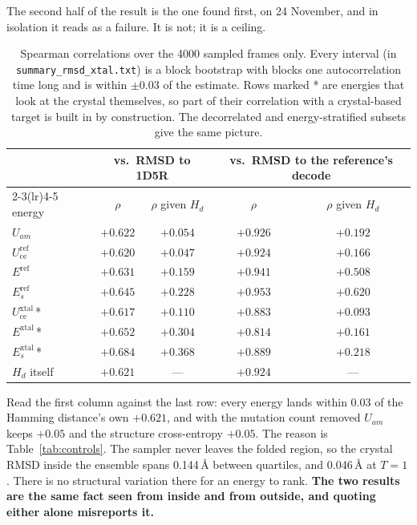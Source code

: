 \documentclass[11pt,a4paper]{article}
\begin{document}
The second half of the result is the one found first, on 24 November, and in isolation it
reads as a failure. It is not; it is a ceiling.

\begin{table}[h]
\centering
\begin{tabular}{lcccc}
\toprule
 & \multicolumn{2}{c}{vs.\ RMSD to 1D5R} & \multicolumn{2}{c}{vs.\ RMSD to the reference's decode} \\
\cmidrule(lr){2-3}\cmidrule(lr){4-5}
energy & $\rho$ & $\rho$ given $H_d$ & $\rho$ & $\rho$ given $H_d$ \\
\midrule
$U_{am}$                      & $+0.622$ & $+0.054$ & $+0.926$ & $+0.192$ \\
$U_{\mathrm{ce}}^{\mathrm{ref}}$ & $+0.620$ & $+0.047$ & $+0.924$ & $+0.166$ \\
$E^{\mathrm{ref}}$            & $+0.631$ & $+0.159$ & $+0.941$ & $+0.508$ \\
$E_s^{\mathrm{ref}}$          & $+0.645$ & $+0.228$ & $\mathbf{+0.953}$ & $\mathbf{+0.620}$ \\
\midrule
$U_{\mathrm{ce}}^{\mathrm{xtal}}$\,* & $+0.617$ & $+0.110$ & $+0.883$ & $+0.093$ \\
$E^{\mathrm{xtal}}$\,*        & $+0.652$ & $+0.304$ & $+0.814$ & $+0.161$ \\
$E_s^{\mathrm{xtal}}$\,*      & $+0.684$ & $+0.368$ & $+0.889$ & $+0.218$ \\
\midrule
$H_d$ itself                  & $+0.621$ & --- & $+0.924$ & --- \\
\bottomrule
\end{tabular}
\caption{Spearman correlations over the 4000 sampled frames only. Every interval (in
\texttt{summary\_rmsd\_xtal.txt}) is a block bootstrap with blocks one autocorrelation time
long and is within $\pm0.03$ of the estimate. Rows marked * are energies that look at the
crystal themselves, so part of their correlation with a crystal-based target is built in by
construction. The decorrelated and energy-stratified subsets give the same picture.}
\label{tab:pooled}
\end{table}

Read the first column against the last row: every energy lands within 0.03 of the Hamming
distance's own $+0.621$, and with the mutation count removed $U_{am}$ keeps $+0.05$ and the
structure cross-entropy $+0.05$. The reason is Table~\ref{tab:controls}. The sampler never
leaves the folded region, so the crystal RMSD inside the ensemble spans 0.144\,\AA{}
between quartiles, and 0.046\,\AA{} at $T=1$. There is no structural variation there for an
energy to rank. \textbf{The two results are the same fact seen from inside and from
outside, and quoting either alone misreports it.}
\end{document}
